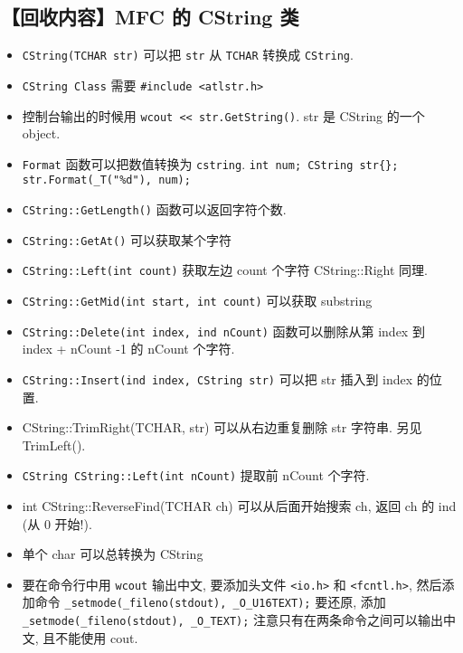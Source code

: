 \subsection{【回收内容】MFC 的 CString 类}
\begin{itemize}
\item \verb`CString(TCHAR str)` 可以把 \verb`str` 从 \verb`TCHAR` 转换成 \verb`CString`.
\item \verb`CString Class` 需要 \verb`#include <atlstr.h>`
\item 控制台输出的时候用 \verb`wcout << str.GetString()`.  str 是 CString 的一个 object.
\item \verb`Format` 函数可以把数值转换为 \verb`cstring`. \verb`int num; CString str{}; str.Format(_T("%d"), num);`
\item \verb`CString::GetLength()` 函数可以返回字符个数.
\item \verb`CString::GetAt()` 可以获取某个字符
\item \verb`CString::Left(int count)` 获取左边 count 个字符 CString::Right 同理.
\item \verb`CString::GetMid(int start, int count)` 可以获取 substring
\item \verb`CString::Delete(int index, ind nCount)` 函数可以删除从第 index 到 index + nCount -1 的 nCount 个字符.
\item \verb`CString::Insert(ind index, CString str)` 可以把 str 插入到 index 的位置.
\item CString::TrimRight(TCHAR, str) 可以从右边重复删除 str 字符串. 另见 TrimLeft().
\item \verb`CString CString::Left(int nCount)` 提取前 nCount 个字符.
\item int CString::ReverseFind(TCHAR ch) 可以从后面开始搜索 ch, 返回 ch 的 ind (从 0 开始!).
\item 单个 char 可以总转换为 CString

\item 要在命令行中用 \verb`wcout` 输出中文, 要添加头文件 \verb`<io.h>` 和 \verb`<fcntl.h>`, 然后添加命令 \verb`_setmode(_fileno(stdout), _O_U16TEXT);` 要还原, 添加 \verb`_setmode(_fileno(stdout), _O_TEXT);` 注意只有在两条命令之间可以输出中文, 且不能使用 cout.
\end{itemize}
